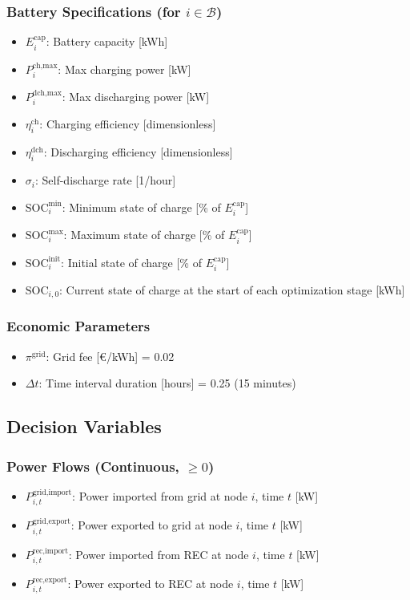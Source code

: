 \documentclass[11pt,a4paper]{article}
\begin{document}
\subsubsection*{Battery Specifications (for $i \in \mathcal{B}$)}
\begin{itemize}
    \item $E_i^{\text{cap}}$: Battery capacity [kWh]
    \item $P_i^{\text{ch,max}}$: Max charging power [kW]
    \item $P_i^{\text{dch,max}}$: Max discharging power [kW]
    \item $\eta_i^{\text{ch}}$: Charging efficiency [dimensionless]
    \item $\eta_i^{\text{dch}}$: Discharging efficiency [dimensionless]
    \item $\sigma_i$: Self-discharge rate [1/hour]
    \item $\text{SOC}_i^{\min}$: Minimum state of charge [\% of $E_i^{\text{cap}}$]
    \item $\text{SOC}_i^{\max}$: Maximum state of charge [\% of $E_i^{\text{cap}}$]
    \item $\text{SOC}_i^{\text{init}}$: Initial state of charge [\% of $E_i^{\text{cap}}$]
    \item $\text{SOC}_{i,0}$: Current state of charge at the start of each optimization stage [kWh]
\end{itemize}

\subsubsection*{Economic Parameters}
\begin{itemize}
    \item $\pi^{\text{grid}}$: Grid fee [€/kWh] = 0.02
    \item $\Delta t$: Time interval duration [hours] = 0.25 (15 minutes)
\end{itemize}

\subsection{Decision Variables}

\subsubsection*{Power Flows (Continuous, $\geq 0$)}
\begin{itemize}
    \item $P_{i,t}^{\text{grid,import}}$: Power imported from grid at node $i$, time $t$ [kW]
    \item $P_{i,t}^{\text{grid,export}}$: Power exported to grid at node $i$, time $t$ [kW]
    \item $P_{i,t}^{\text{rec,import}}$: Power imported from REC at node $i$, time $t$ [kW]
    \item $P_{i,t}^{\text{rec,export}}$: Power exported to REC at node $i$, time $t$ [kW]
\end{itemize}
\end{document}
